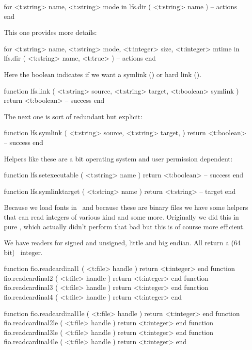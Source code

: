 \starttyping[option=LUA]
for
    <t:string> name,
    <t:string> mode
in lfs.dir (
    <t:string> name
)
    -- actions
end
\stoptyping

This one provides more details:

\starttyping[option=LUA]
for
    <t:string>  name,
    <t:string>  mode,
    <t:integer> size,
    <t:integer> mtime
in lfs.dir (
    <t:string>  name,
    <t:true>
)
    -- actions
end
\stoptyping

Here the boolean indicates if we want a symlink () or hard link
().

\starttyping[option=LUA]
function lfs.link (
    <t:string>  source,
    <t:string>  target,
    <t:boolean> symlink
)
    return <t:boolean> -- success
end
\stoptyping

The next one is sort of redundant but explicit:

\starttyping[option=LUA]
function lfs.symlink (
    <t:string>  source,
    <t:string>  target,
)
    return <t:boolean> -- success
end
\stoptyping

Helpers like these are a bit operating system and user permission dependent:

\starttyping[option=LUA]
function lfs.setexecutable ( <t:string> name )
    return <t:boolean> -- success
end
\stoptyping

\starttyping[option=LUA]
function lfs.symlinktarget ( <t:string> name )
    return <t:string> -- target
end
\stoptyping

\stopsubsection

\startsubsection[title=Reading from a file]

Because we load fonts in \LUA\ and because these are binary files we have some
helpers that can read integers of various kind and some more. Originally we did
this in pure \LUA, which actually didn't perform that bad but this is of course
more efficient.

We have readers for signed and unsigned, little and big endian. All return a (64
bit) \LUA\ integer.

\starttyping[option=LUA]
function fio.readcardinal1 ( <t:file> handle ) return <t:integer> end
function fio.readcardinal2 ( <t:file> handle ) return <t:integer> end
function fio.readcardinal3 ( <t:file> handle ) return <t:integer> end
function fio.readcardinal4 ( <t:file> handle ) return <t:integer> end

function fio.readcardinal1le ( <t:file> handle ) return <t:integer> end
function fio.readcardinal2le ( <t:file> handle ) return <t:integer> end
function fio.readcardinal3le ( <t:file> handle ) return <t:integer> end
function fio.readcardinal4le ( <t:file> handle ) return <t:integer> end

